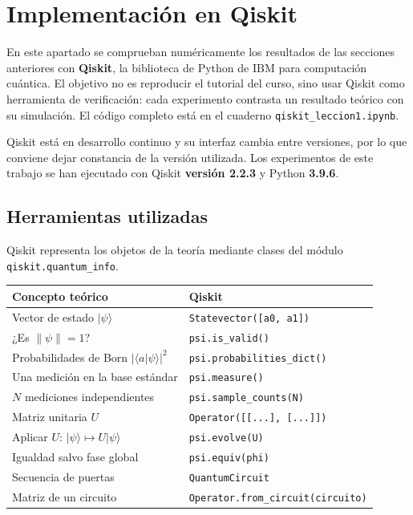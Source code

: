 \documentclass[11pt, a4paper, twoside, openright]{report}
\begin{document}
\cleardoublepage
\section{Implementación en Qiskit}

\noindent En este apartado se comprueban numéricamente los resultados de las secciones anteriores con \textbf{Qiskit}, la biblioteca de Python de IBM para computación cuántica. El objetivo no es reproducir el tutorial del curso, sino usar Qiskit como herramienta de verificación: cada experimento contrasta un resultado teórico con su simulación. El código completo está en el cuaderno \texttt{qiskit\_leccion1.ipynb}.

\noindent Qiskit está en desarrollo continuo y su interfaz cambia entre versiones, por lo que conviene dejar constancia de la versión utilizada. Los experimentos de este trabajo se han ejecutado con Qiskit \textbf{versión 2.2.3} y Python \textbf{3.9.6}.

\subsection{Herramientas utilizadas}

\noindent Qiskit representa los objetos de la teoría mediante clases del módulo \texttt{qiskit.quantum\_info}.

\begin{center}
\begin{tabular}{l|l}
\textbf{Concepto teórico} & \textbf{Qiskit} \\ \hline
Vector de estado $|\psi\rangle$ & \texttt{Statevector([a0, a1])} \\
¿Es $\|\psi\| = 1$? & \texttt{psi.is\_valid()} \\
Probabilidades de Born $|\langle a|\psi\rangle|^2$ & \texttt{psi.probabilities\_dict()} \\
Una medición en la base estándar & \texttt{psi.measure()} \\
$N$ mediciones independientes & \texttt{psi.sample\_counts(N)} \\
Matriz unitaria $U$ & \texttt{Operator([[...], [...]])} \\
Aplicar $U$: $|\psi\rangle \mapsto U|\psi\rangle$ & \texttt{psi.evolve(U)} \\
Igualdad salvo fase global & \texttt{psi.equiv(phi)} \\
Secuencia de puertas & \texttt{QuantumCircuit} \\
Matriz de un circuito & \texttt{Operator.from\_circuit(circuito)}
\end{tabular}
\end{center}
\end{document}
